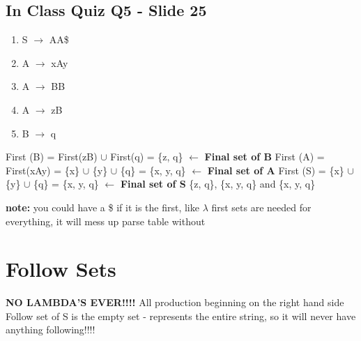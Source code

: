 \documentclass{report}
\begin{document}
\subsection{In Class Quiz Q5 - Slide 25}
\vspace{-1.5em}
\begin{multicols}{2}
  \begin{enumerate}
    \setlength\itemsep{-.25em}
    \item S $\rightarrow$ AA\$
    \item A $\rightarrow$ xAy
    \item A $\rightarrow$ BB
    \item A $\rightarrow$ zB
    \item B $\rightarrow$ q
  \end{enumerate}
  \setlength{\leftskip}{-12em}
First (B) = First(zB) $\cup$ First(q) = \{z, q\}  $\leftarrow$ \textbf{Final set of B}\newline
First (A) = First(xAy) \newline
\indent\hspace{1cm}= \{x\} $\cup$ \{y\} $\cup$ \{q\} = \{x, y, q\} $\leftarrow$ \textbf{Final set of A}\newline
First (S) = \{x\} $\cup$ \{y\} $\cup$ \{q\} = \{x, y, q\} $\leftarrow$ \textbf{Final set of S}\newline
\{z, q\}, \{x, y, q\} and \{x, y, q\}\newline
\end{multicols}
\vspace{-1em}
\noindent\textbf{note:} you could have a \$ if it is the first, like $\lambda$\newline
\indent\hspace{.5cm}first sets are needed for everything, it will mess up parse table without

\section{Follow Sets}
\textbf{NO LAMBDA'S EVER!!!!}
All production beginning on the right hand side\newline
Follow set of S is the empty set
 - represents the entire string, so it will never have anything following!!!!
\end{document}
